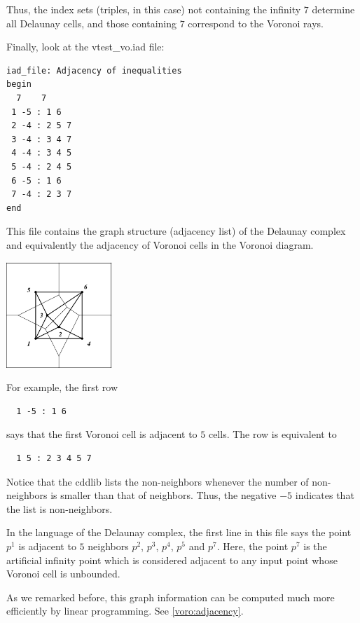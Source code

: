 \documentclass[a4paper,12pt]{article}
\newcommand{\HBrule}{\noindent \hrulefill \medskip}
\newcommand{\HTrule}{\medskip \noindent \hrulefill}
\begin{document}
\begin{small}
Thus, the index sets (triples, in this case) not containing
the infinity $7$ determine all Delaunay cells, and those
containing $7$ correspond to the Voronoi rays.

Finally, look at the vtest\_vo.iad file:
 
 
\HTrule
\begin{verbatim}
iad_file: Adjacency of inequalities
begin
  7    7
 1 -5 : 1 6 
 2 -4 : 2 5 7 
 3 -4 : 3 4 7 
 4 -4 : 3 4 5 
 5 -4 : 2 4 5 
 6 -5 : 1 6 
 7 -4 : 2 3 7 
end
\end{verbatim}
\HBrule

\noindent
This file contains the graph structure (adjacency list) of the Delaunay complex
and equivalently the adjacency of Voronoi cells in the Voronoi
diagram.

\bigskip
\begin{center}
\includegraphics[height=40mm]{vtest_draw_vode}
\end{center}

\noindent
For example, the first row
\begin{verbatim}
  1 -5 : 1 6 
\end{verbatim}
says that the first Voronoi cell is adjacent to $5$ cells.
The row is equivalent to
\begin{verbatim}
  1 5 : 2 3 4 5 7
\end{verbatim}
Notice that the cddlib lists the non-neighbors whenever
the number of non-neighbors is smaller than that of neighbors.  
Thus, the negative
$-5$ indicates that the list is non-neighbors.

In the language of the Delaunay complex, the first line in this file
says the point $p^1$ is adjacent to $5$ neighbors
$p^2$, $p^3$, $p^4$, $p^5$ and $p^7$.  Here,
the point $p^7$ is the artificial infinity point
which is considered adjacent to any input point
whose Voronoi cell is unbounded.

As we remarked before, this graph information can be
computed much more efficiently by linear programming.
See \ref{voro:adjacency}.
\end{small}
\end{document}
